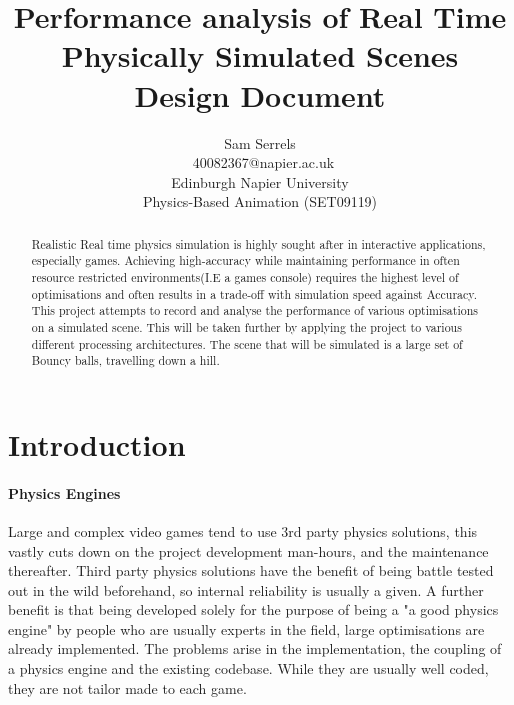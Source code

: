 \documentclass[conference]{acmsiggraph}
\title{Performance analysis of Real Time Physically Simulated Scenes \\
	   Design Document}
\author{Sam Serrels\\\ 40082367@napier.ac.uk \\
Edinburgh Napier University\\
Physics-Based Animation (SET09119)}
\begin{document}

\maketitle

\begin{abstract}
Realistic Real time physics simulation is highly sought after in interactive applications, especially games. Achieving high-accuracy while maintaining performance in often resource restricted environments(I.E a games console) requires the highest level of optimisations and often results in a trade-off with simulation speed against Accuracy. This project attempts to record and analyse the performance of various optimisations on a simulated scene. This will be taken further by applying the project to various different processing architectures. The scene that will be simulated is a large set of Bouncy balls, travelling down a hill.
\end{abstract}

\keywordlist

\section{Introduction}

\paragraph{Physics Engines}
Large and complex video games tend to use 3rd party physics solutions, this vastly cuts down on the project development man-hours, and the maintenance thereafter. Third party physics solutions have the benefit of being battle tested out in the wild beforehand, so internal reliability is usually a given. A further benefit is that being developed solely for the purpose of being a "a good physics engine" by people who are usually experts in the field, large optimisations are already implemented. The problems arise in the implementation, the coupling of a physics engine and the existing codebase. While they are usually well coded, they are not tailor made to each game. 
\end{document}
